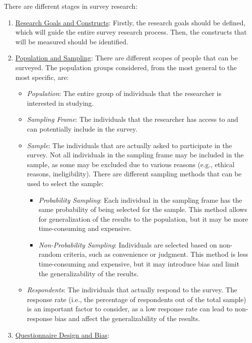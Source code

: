 There are different stages in survey research:
\begin{enumerate}
    \item \ul{Research Goals and Constructs}:
    Firstly, the research goals should be defined, which will guide the entire survey research process. Then, the constructs that will be measured should be identified.
    \item \ul{Population and Sampling}: There are different scopes of people that can be surveyed. The population groups considered, from the most general to the most specific, are:
    \begin{itemize}
        \item \emph{Population}: The entire group of individuals that the researcher is interested in studying.
        \item \emph{Sampling Frame}: The individuals that the researcher has access to and can potentially include in the survey.
        \item \emph{Sample}: The individuals that are actually asked to participate in the survey. Not all individuals in the sampling frame may be included in the sample, as some may be excluded due to various reasons (e.g., ethical reasons, ineligibility). There are different sampling methods that can be used to select the sample:
        \begin{itemize}
            \item \emph{Probability Sampling}: Each individual in the sampling frame has the same probability of being selected for the sample. This method allows for generalization of the results to the population, but it may be more time-consuming and expensive.
            \item \emph{Non-Probability Sampling}: Individuals are selected based on non-random criteria, such as convenience or judgment. This method is less time-consuming and expensive, but it may introduce bias and limit the generalizability of the results.
        \end{itemize}
        \item \emph{Respondents}: The individuals that actually respond to the survey. The response rate (i.e., the percentage of respondents out of the total sample) is an important factor to consider, as a low response rate can lead to non-response bias and affect the generalizability of the results.
    \end{itemize}
    \item \ul{Questionnaire Design and Bias}:
    

\end{enumerate}
